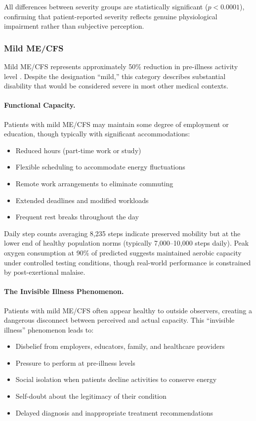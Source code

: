 All differences between severity groups are statistically significant ($p < 0.0001$), confirming that patient-reported severity reflects genuine physiological impairment rather than subjective perception.

\subsubsection{Mild ME/CFS}

Mild ME/CFS represents approximately 50\% reduction in pre-illness activity level \cite{Carruthers2011ICC}. Despite the designation ``mild,'' this category describes substantial disability that would be considered severe in most other medical contexts.

\paragraph{Functional Capacity.}
Patients with mild ME/CFS may maintain some degree of employment or education, though typically with significant accommodations:
\begin{itemize}
    \item Reduced hours (part-time work or study)
    \item Flexible scheduling to accommodate energy fluctuations
    \item Remote work arrangements to eliminate commuting
    \item Extended deadlines and modified workloads
    \item Frequent rest breaks throughout the day
\end{itemize}

Daily step counts averaging 8,235 steps indicate preserved mobility but at the lower end of healthy population norms (typically 7,000--10,000 steps daily). Peak oxygen consumption at 90\% of predicted suggests maintained aerobic capacity under controlled testing conditions, though real-world performance is constrained by post-exertional malaise.

\paragraph{The Invisible Illness Phenomenon.}
Patients with mild ME/CFS often appear healthy to outside observers, creating a dangerous disconnect between perceived and actual capacity. This ``invisible illness'' phenomenon leads to:
\begin{itemize}
    \item Disbelief from employers, educators, family, and healthcare providers
    \item Pressure to perform at pre-illness levels
    \item Social isolation when patients decline activities to conserve energy
    \item Self-doubt about the legitimacy of their condition
    \item Delayed diagnosis and inappropriate treatment recommendations
\end{itemize}

